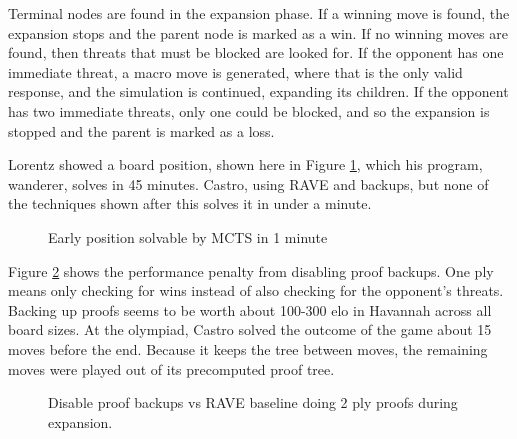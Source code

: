 Terminal nodes are found in the expansion phase. If a winning move is found, the expansion stops and the parent node is marked as a win. If no winning moves are found, then threats that must be blocked are looked for. If the opponent has one immediate threat, a macro move is generated, where that is the only valid response, and the simulation is continued, expanding its children. If the opponent has two immediate threats, only one could be blocked, and so the expansion is stopped and the parent is marked as a loss.

Lorentz showed a board position, shown here in Figure \ref{fig:lorentzproof}, which his program, wanderer, solves in 45 minutes. Castro, using RAVE and backups, but none of the techniques shown after this solves it in under a minute.

\begin{figure}
	\centering
	\begin{HavannahBoard}[board size=4,coordinate style=classical,show coordinates=false]
	\end{HavannahBoard}
	\caption{Early position solvable by MCTS in 1 minute}
	\label{fig:lorentzproof}
\end{figure}

Figure \ref{fig:proofbackups} shows the performance penalty from disabling proof backups. One ply means only checking for wins instead of also checking for the opponent's threats. Backing up proofs seems to be worth about 100-300 elo in Havannah across all board sizes. At the olympiad, Castro solved the outcome of the game about 15 moves before the end. Because it keeps the tree between moves, the remaining moves were played out of its precomputed proof tree.

\begin{figure}
\centering
{}
	\caption{Disable proof backups vs RAVE baseline doing 2 ply proofs during expansion.}
	\label{fig:proofbackups}
\end{figure}


